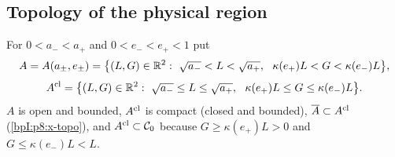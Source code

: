 \subsection{Topology of the physical region}\label{bpI:p8:sec-top}

\begin{definition}\label{bpI:p8:A}
For $0<a_-<a_+$ and $0<e_-<e_+<1$ put
\[
A=A(a_\pm,e_\pm)=\bigl\{(L,G)\in\R^2:\ \sqrt{a_-}<L<\sqrt{a_+},\ \ \kappa(e_+)L<G<\kappa(e_-)L\bigr\},
\]
\[
A^{\rm cl}=\bigl\{(L,G)\in\mathbb{R}^2:\ \sqrt{a_-}\le L\le\sqrt{a_+},\ \ \kappa(e_+)L\le G\le\kappa(e_-)L\bigr\}.
\]
$A$ is open and bounded, $A^{\rm cl}$ is compact (closed and bounded), $\overline A\subset A^{\rm cl}$ (\ref{bpI:p8:x-topo}), and
$A^{\rm cl}\subset\mathcal C_0$ because $G\ge\kappa(e_+)L>0$ and $G\le\kappa(e_-)L<L$.
\end{definition}


